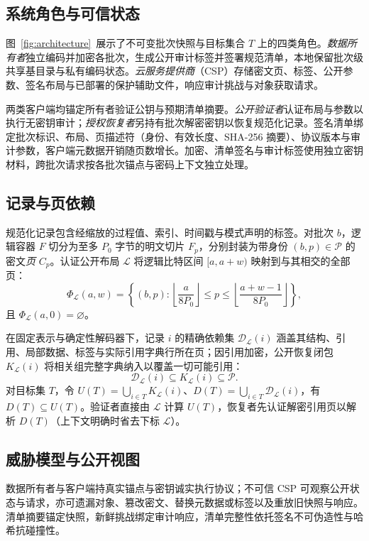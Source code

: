 \documentclass[10pt,journal]{IEEEtran}
\begin{document}
\subsection{系统角色与可信状态}
图~\ref{fig:architecture}~展示了不可变批次快照与目标集合 $T$ 上的四类角色。\emph{数据所有者}独立编码并加密各批次，生成公开审计标签并签署规范清单，本地保留批次级共享基目录与私有编码状态。\emph{云服务提供商}（CSP）存储密文页、标签、公开参数、签名布局与已部署的保护辅助文件，响应审计挑战与对象获取请求。

两类客户端均锚定所有者验证公钥与预期清单摘要。\emph{公开验证者}认证布局与参数以执行无密钥审计；\emph{授权恢复者}另持有批次解密密钥以恢复规范化记录。签名清单绑定批次标识、布局、页描述符（身份、有效长度、SHA-256 摘要）、协议版本与审计参数，客户端元数据开销随页数增长。加密、清单签名与审计标签使用独立密钥材料，跨批次请求按各批次锚点与密码上下文独立处理。

\subsection{记录与页依赖}
规范化记录包含经缩放的过程值、索引、时间戳与模式声明的标签。对批次 $b$，逻辑容器 $F$ 切分为至多 $P_0$ 字节的明文切片 $F_p$，分别封装为带身份 $(b,p)\in\mathcal P$ 的密文\emph{页} $C_p$。认证公开布局 $\mathcal L$ 将逻辑比特区间 $[a,a+w)$ 映射到与其相交的全部页：
\begin{equation}\label{eq:phi}
\Phi_{\mathcal L}(a,w)=
\left\{(b,p):\left\lfloor\frac{a}{8P_0}\right\rfloor
\leq p\leq\left\lfloor\frac{a+w-1}{8P_0}\right\rfloor\right\},
\end{equation}
且 $\Phi_{\mathcal L}(a,0)=\varnothing$。

在固定表示与确定性解码器下，记录 $i$ 的精确依赖集 $\mathcal D_{\mathcal L}(i)$ 涵盖其结构、引用、局部数据、标签与实际引用字典行所在页；因引用加密，公开恢复闭包 $K_{\mathcal L}(i)$ 将相关组完整字典纳入以覆盖一切可能引用：
\begin{equation}\label{eq:sufficient-set}
\mathcal D_{\mathcal L}(i)\subseteq K_{\mathcal L}(i)\subseteq\mathcal P.
\end{equation}
对目标集 $T$，令 $U(T)=\bigcup_{i\in T}K_{\mathcal L}(i)$、$D(T)=\bigcup_{i\in T}\mathcal D_{\mathcal L}(i)$，有 $D(T)\subseteq U(T)$。验证者直接由 $\mathcal L$ 计算 $U(T)$，恢复者先认证解密引用页以解析 $D(T)$（上下文明确时省去下标 $\mathcal L$）。

\subsection{威胁模型与公开视图}
数据所有者与客户端持真实锚点与密钥诚实执行协议；不可信 CSP 可观察公开状态与请求，亦可遗漏对象、篡改密文、替换元数据或标签以及重放旧快照与响应。清单摘要锚定快照，新鲜挑战绑定审计响应，清单完整性依托签名不可伪造性与哈希抗碰撞性。
\end{document}
